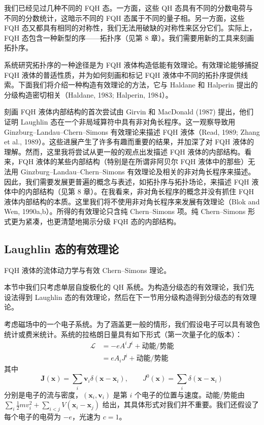 我们已经见过几种不同的 FQH 态。一方面，这些 QH 态具有不同的分数电荷与不同的分数统计，这暗示不同的 FQH 态属于不同的量子相。另一方面，这些 FQH 态又都具有相同的对称性，我们无法用破缺的对称性来区分它们。实际上，FQH 态包含一种新型的序——拓扑序（见第 8 章）。我们需要用新的工具来刻画拓扑序。

系统研究拓扑序的一种途径是为 FQH 液体构造低能有效理论。有效理论能够捕捉 FQH 液体的普适性质，并为如何刻画和标记 FQH 液体中不同的拓扑序提供线索。下面我们将介绍一种构造有效理论的方法，它与 Haldane 和 Halperin 提出的分级构造密切相关（Haldane, 1983; Halperin, 1984）。

刻画 FQH 液体内部结构的首次尝试由 Girvin 和 MacDonald (1987) 提出，他们证明 Laughlin 态在一个非局域算符中具有非对角长程序。这一观察导致用 Ginzburg--Landau--Chern--Simons 有效理论来描述 FQH 液体（Read, 1989; Zhang et al., 1989）。这些进展产生了许多有趣而重要的结果，并加深了对 FQH 液体的理解。然而，这里我将尝试从更一般的观点出发描述 FQH 液体的内部结构。看来，FQH 液体的某些内部结构（特别是在所谓非阿贝尔 FQH 液体中的那些）无法用 Ginzburg--Landau--Chern--Simons 有效理论及相关的非对角长程序来描述。因此，我们需要发展更普遍的概念与表述，如拓扑序与拓扑场论，来描述 FQH 液体中的内部结构（见第 8 章）。在我看来，非对角长程序的概念并没有抓住 FQH 液体内部结构的本质。这里我们将不使用非对角长程序来发展有效理论（Blok and Wen, 1990a,b）。所得的有效理论只含纯 Chern--Simons 项。纯 Chern--Simons 形式更为紧凑，也更清楚地揭示分级 FQH 态的内部结构。

\subsection{Laughlin 态的有效理论}

\begin{keypoints}
\item FQH 液体的流体动力学与有效 Chern--Simons 理论。
\end{keypoints}

本节中我们只考虑单层自旋极化的 QH 系统。为构造分级态的有效理论，我们先设法得到 Laughlin 态的有效理论，然后在下一节用分级构造得到分级态的有效理论。

考虑磁场中的一个电子系统。为了涵盖更一般的情形，我们假设电子可以具有玻色统计或费米统计。系统的拉格朗日量具有如下形式（第一次量子化的版本）：
\begin{equation*}
\begin{aligned}
\mathcal{L}&=-eA^iJ^i+\text{动能/势能}\\
&=eA_iJ^i+\text{动能/势能}
\end{aligned}
\tag{7.3.1}
\end{equation*}
其中
\begin{equation*}
\pmb{J}(\pmb{x})=\sum_i\pmb{v}_i\delta(\pmb{x}-\pmb{x}_i),\qquad J^0(\pmb{x})=\sum_i\delta(\pmb{x}-\pmb{x}_i)
\tag{7.3.2}
\end{equation*}
分别是电子的流与密度，$(\pmb{x}_i,\pmb{v}_i)$ 是第 $i$ 个电子的位置与速度。动能/势能由 $\sum_i\frac{1}{2}mv_i^2+\sum_{i<j}V(\pmb{x}_i-\pmb{x}_j)$ 给出，其具体形式对我们并不重要。我们还假设了每个电子的电荷为 $-e$，光速为 $c=1$。

